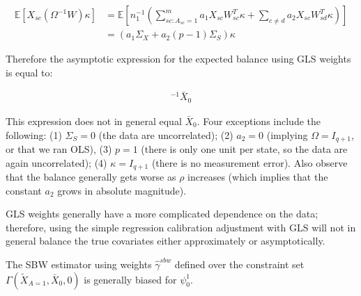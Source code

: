 \begin{remark}
    \begin{align*}
        \mathbb{E}[X_{sc}(\Omega^{-1}W)\kappa] &= \mathbb{E}[n_1^{-1}(\sum_{sc: A_{sc} =1}^ma_1X_{sc}W_{sc}^T\kappa + \sum_{c\ne d}a_2X_{sc}W_{sd}^T\kappa)] \\
        &= (a_1\Sigma_X + a_2(p-1)\Sigma_S)\kappa
    \end{align*}
    
    Therefore the asymptotic expression for the expected balance using GLS weights is equal to:
    
    \begin{align*}
    [a_1\Sigma_X\kappa + a_2(p-1)\Sigma_S\kappa][a_1\Sigma_X\kappa + a_2(p-1)\kappa^T\Sigma_S\kappa]^{-1}\bar{X}_0 
    \end{align*}

    This expression does not in general equal $\bar{X}_0$. Four exceptions include the following: (1) $\Sigma_S = 0$ (the data are uncorrelated); (2) $a_2 = 0$ (implying $\Omega = I_{q+1}$, or that we ran OLS), (3) $p = 1$ (there is only one unit per state, so the data are again uncorrelated); (4) $\kappa = I_{q+1}$ (there is no measurement error). Also observe that the balance generally gets worse as $\rho$ increases (which implies that the constant $a_2$ grows in absolute magnitude).
    
    GLS weights generally have a more complicated dependence on the data; therefore, using the simple regression calibration adjustment with GLS will not in general balance the true covariates either approximately or asymptotically.
\end{remark}

\begin{proposition}\label{cl9}
    The SBW estimator using weights $\hat{\gamma}^{sbw}$ defined over the constraint set $\Gamma(\tilde{X}_{A=1}, \bar{X}_0, 0)$ is generally biased for $\psi^1_0$.
\end{proposition}

